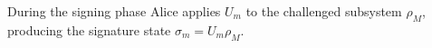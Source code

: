 \documentclass[a0,portrait]{a0poster}
\theoremstyle{definition}
\begin{document}
\begin{multicols}{2}





\medskip
During the signing phase Alice applies $U_m$ to the challenged subsystem $\rho_M$,
producing the signature state $\sigma_m = U_m\rho_M$.







\end{multicols}
\end{document}
